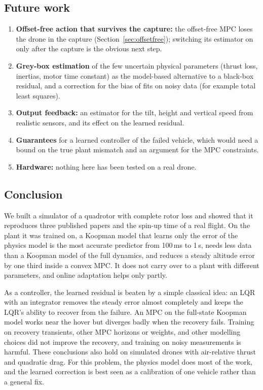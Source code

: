 \subsection{Future work}
\begin{enumerate}
  \item \textbf{Offset-free action that survives the capture:} the offset-free MPC loses the drone in the capture (Section~\ref{sec:offsetfree}); switching its estimator on only after the capture is the obvious next step.
  \item \textbf{Grey-box estimation} of the few uncertain physical parameters (thrust loss, inertias, motor time constant) as the model-based alternative to a black-box residual, and a correction for the bias of fits on noisy data (for example total least squares).
  \item \textbf{Output feedback:} an estimator for the tilt, height and vertical speed from realistic sensors, and its effect on the learned residual.
  \item \textbf{Guarantees} for a learned controller of the failed vehicle, which would need a bound on the true plant mismatch and an argument for the MPC constraints.
  \item \textbf{Hardware:} nothing here has been tested on a real drone.
\end{enumerate}

\subsection{Conclusion}
We built a simulator of a quadrotor with complete rotor loss and showed that it reproduces three published papers and the spin-up time of a real flight. On the plant it was trained on, a Koopman model that learns only the error of the physics model is the most accurate predictor from 100\,ms to 1\,s, needs less data than a Koopman model of the full dynamics, and reduces a steady altitude error by one third inside a convex MPC. It does not carry over to a plant with different parameters, and online adaptation helps only partly.

As a controller, the learned residual is beaten by a simple classical idea: an LQR with an integrator removes the steady error almost completely and keeps the LQR's ability to recover from the failure. An MPC on the full-state Koopman model works near the hover but diverges badly when the recovery fails. Training on recovery transients, other MPC horizons or weights, and other modelling choices did not improve the recovery, and training on noisy measurements is harmful. These conclusions also hold on simulated drones with air-relative thrust and quadratic drag. For this problem, the physics model does most of the work, and the learned correction is best seen as a calibration of one vehicle rather than a general fix.
